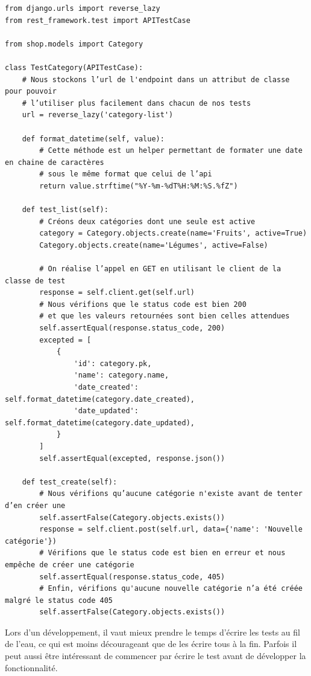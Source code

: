 \documentclass[a4paper]{article}
\begin{document}
\begin{verbatim}
from django.urls import reverse_lazy
from rest_framework.test import APITestCase

from shop.models import Category

class TestCategory(APITestCase):
    # Nous stockons l’url de l'endpoint dans un attribut de classe pour pouvoir
    # l’utiliser plus facilement dans chacun de nos tests
    url = reverse_lazy('category-list')

    def format_datetime(self, value):
        # Cette méthode est un helper permettant de formater une date en chaine de caractères 
        # sous le même format que celui de l’api
        return value.strftime("%Y-%m-%dT%H:%M:%S.%fZ")

    def test_list(self):
        # Créons deux catégories dont une seule est active
        category = Category.objects.create(name='Fruits', active=True)
        Category.objects.create(name='Légumes', active=False)

        # On réalise l’appel en GET en utilisant le client de la classe de test
        response = self.client.get(self.url)
        # Nous vérifions que le status code est bien 200
        # et que les valeurs retournées sont bien celles attendues
        self.assertEqual(response.status_code, 200)
        excepted = [
            {
                'id': category.pk,
                'name': category.name,
                'date_created': self.format_datetime(category.date_created),
                'date_updated': self.format_datetime(category.date_updated),
            }
        ]
        self.assertEqual(excepted, response.json())

    def test_create(self):
        # Nous vérifions qu’aucune catégorie n'existe avant de tenter d’en créer une
        self.assertFalse(Category.objects.exists())
        response = self.client.post(self.url, data={'name': 'Nouvelle catégorie'})
        # Vérifions que le status code est bien en erreur et nous empêche de créer une catégorie
        self.assertEqual(response.status_code, 405)
        # Enfin, vérifions qu'aucune nouvelle catégorie n’a été créée malgré le status code 405
        self.assertFalse(Category.objects.exists())
\end{verbatim}

\begin{theorem}
Lors d’un développement, il vaut mieux prendre le temps d’écrire les tests au fil de l’eau, ce qui est moins décourageant que de les écrire tous à la fin. Parfois il peut aussi être intéressant de commencer par écrire le test avant de développer la fonctionnalité.
\end{theorem}
\end{document}
